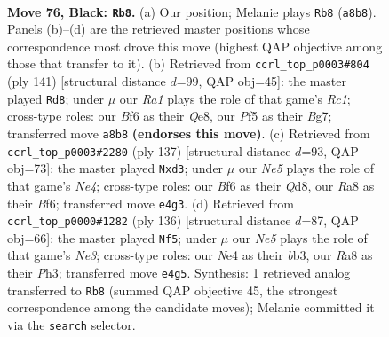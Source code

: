 \documentclass[11pt]{article}
\begin{document}
\clearpage

\begin{figure}[p]\centering
\begin{subfigure}{0.46\textwidth}\centering
\resizebox{\linewidth}{!}{%
\newchessgame
\chessboard[
  setfen={r7/q5k1/5b2/P1pQ1p2/3pnPp1/8/1R1BP3/3NK3 b - - 13 76},
  showmover=false,
  pgfstyle=straightmove, color=movearrow, markmove={a8-b8}
]}
\caption{}
\end{subfigure}\hfill
\begin{subfigure}{0.46\textwidth}\centering
\resizebox{\linewidth}{!}{%
\newchessgame
\chessboard[
  setfen={2r1q1k1/6b1/3P1p2/4pQ1p/2p1P3/1p1n1R2/3B2PK/1B6 b - - 0 71},
  showmover=false,
  pgfstyle=straightmove, color=movearrow, markmove={c8-d8}
]}
\caption{}
\end{subfigure}
\\[4pt]
\begin{subfigure}{0.46\textwidth}\centering
\resizebox{\linewidth}{!}{%
\newchessgame
\chessboard[
  setfen={3q2k1/5p2/5bp1/4n3/1P1p1QP1/p2B1P2/P7/3R3K b - - 0 69},
  showmover=false,
  pgfstyle=straightmove, color=movearrow, markmove={e5-d3}
]}
\caption{}
\end{subfigure}\hfill
\begin{subfigure}{0.46\textwidth}\centering
\resizebox{\linewidth}{!}{%
\newchessgame
\chessboard[
  setfen={1b6/6pk/5p1p/8/3BP1P1/1b1qNP1P/1Q4K1/8 w - - 9 69},
  showmover=false,
  pgfstyle=straightmove, color=movearrow, markmove={e3-f5}
]}
\caption{}
\end{subfigure}
\caption{\textbf{Move 76, Black: \texttt{Rb8}.} (a) Our position; Melanie plays \texttt{Rb8} (\texttt{a8b8}). Panels (b)--(d) are the retrieved master positions whose correspondence most drove this move (highest QAP objective among those that transfer to it). (b) Retrieved from \texttt{ccrl\_top\_p0003\#804} (ply 141) [structural distance $d$=99, QAP obj=45]: the master played \texttt{Rd8}; under $\mu$ our \emph{Ra1} plays the role of that game's \emph{Rc1}; cross-type roles: our \emph{B}f6 as their \emph{Q}e8, our \emph{P}f5 as their \emph{B}g7; transferred move \texttt{a8b8} \textbf{(endorses this move)}. (c) Retrieved from \texttt{ccrl\_top\_p0003\#2280} (ply 137) [structural distance $d$=93, QAP obj=73]: the master played \texttt{Nxd3}; under $\mu$ our \emph{Ne5} plays the role of that game's \emph{Ne4}; cross-type roles: our \emph{B}f6 as their \emph{Q}d8, our \emph{R}a8 as their \emph{B}f6; transferred move \texttt{e4g3}. (d) Retrieved from \texttt{ccrl\_top\_p0000\#1282} (ply 136) [structural distance $d$=87, QAP obj=66]: the master played \texttt{Nf5}; under $\mu$ our \emph{Ne5} plays the role of that game's \emph{Ne3}; cross-type roles: our \emph{N}e4 as their \emph{b}b3, our \emph{R}a8 as their \emph{P}h3; transferred move \texttt{e4g5}. Synthesis: 1 retrieved analog transferred to \texttt{Rb8} (summed QAP objective 45, the strongest correspondence among the candidate moves); Melanie committed it via the \texttt{search} selector.}
\label{fig:thought-m151}
\end{figure}
\end{document}
